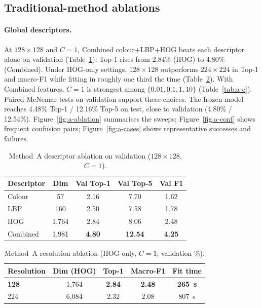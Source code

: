 \documentclass[10pt,twocolumn,letterpaper]{article}
\begin{document}
\subsection{Traditional-method ablations}

\paragraph{Global descriptors.}
At $128\times128$ and $C{=}1$, Combined colour+LBP+HOG beats each descriptor
alone on validation (Table~\ref{tab:a-desc}): Top-1 rises from 2.84\% (HOG)
to 4.80\% (Combined). Under HOG-only settings, $128\times128$ outperforms
$224\times224$ in Top-1 and macro-F1 while fitting in roughly one third the
time (Table~\ref{tab:a-res}). With Combined features, $C{=}1$ is strongest
among $\{0.01,0.1,1,10\}$ (Table~\ref{tab:a-c}). Paired McNemar tests on
validation support these choices. The frozen model reaches 4.48\% Top-1 /
12.16\% Top-5 on test, close to validation (4.80\% / 12.54\%).
Figure~\ref{fig:a-ablation} summarises the sweeps;
Figure~\ref{fig:a-conf} shows frequent confusion pairs;
Figure~\ref{fig:a-cases} shows representative successes and failures.

\begin{table}[t]
\centering
\footnotesize
\setlength{\tabcolsep}{3pt}
\begin{tabular}{@{}lcccc@{}}
\toprule
Descriptor & Dim & Val Top-1 & Val Top-5 & Val F1 \\
\midrule
Colour & 57 & 2.16 & 7.70 & 1.62 \\
LBP & 160 & 2.50 & 7.58 & 1.78 \\
HOG & 1{,}764 & 2.84 & 8.06 & 2.48 \\
Combined & 1{,}981 & \textbf{4.80} & \textbf{12.54} & \textbf{4.25} \\
\bottomrule
\end{tabular}
\caption{Method~A descriptor ablation on validation ($128\times128$, $C{=}1$).}
\label{tab:a-desc}
\end{table}

\begin{table}[t]
\centering
\footnotesize
\begin{tabular}{@{}lcccc@{}}
\toprule
Resolution & Dim (HOG) & Top-1 & Macro-F1 & Fit time \\
\midrule
\textbf{128} & 1{,}764 & \textbf{2.84} & \textbf{2.48} & \textbf{265~s} \\
224 & 6{,}084 & 2.32 & 2.08 & 807~s \\
\bottomrule
\end{tabular}
\caption{Method~A resolution ablation (HOG only, $C{=}1$; validation \%).}
\label{tab:a-res}
\end{table}
\end{document}
